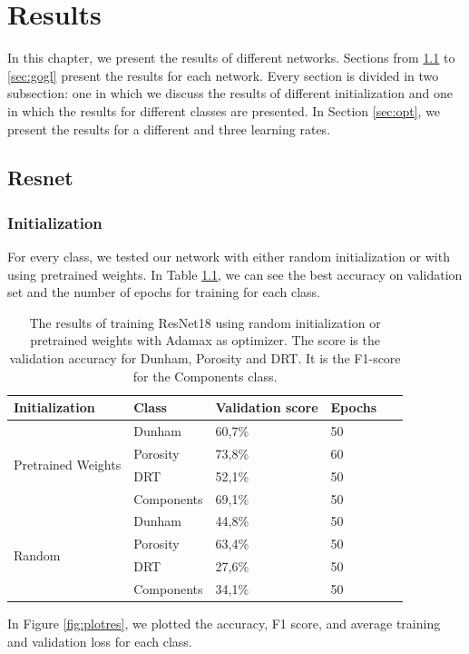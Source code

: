 \chapter{Results}\label{chp:results}

In this chapter, we present the results of different networks. Sections from \ref{sec:res} to \ref{sec:gogl} present the results for each network. Every section is divided in two subsection: one in which we discuss the results of different initialization and one in which the results for different classes are presented. In Section \ref{sec:opt}, we present the results for a different and three learning rates. 
\section{Resnet}\label{sec:res}
\subsection{Initialization}
For every class, we tested our network with either random initialization or with using pretrained weights. In Table \ref{tab:resinit}, we can see the best accuracy on validation set and the number of epochs for training for each class.  

\begin{table}
\caption{\label{tab:resinit} The results of training ResNet18 using random initialization or pretrained weights with Adamax as optimizer. The score is the validation accuracy for Dunham, Porosity and DRT. It is the F1-score for the Components class.}
\centering
\begin{tabular}[b]{| l | l | l | l | l |}
\hline
    Initialization & Class & Validation score & Epochs\ \\ \hline
    \multirow{4}{*}{Pretrained Weights} & Dunham &  60,7\%  & 50 \\ 
    & Porosity & 73,8\%  &  60 \\
    &DRT & 52,1\% &  50 \\
    &Components & 69,1\% &  50 \\ \hline
     \multirow{4}{*}{Random} & Dunham &  44,8\%  & 50 \\
    & Porosity & 63,4\% &  50 \\
    &DRT & 27,6\% & 50 \\
    &Components & 34,1\% &  50 \\ \hline
    
\end{tabular} 
\end{table}
In Figure \ref{fig:plotres}, we plotted the accuracy, F1 score, and average training and validation loss for each class. 


